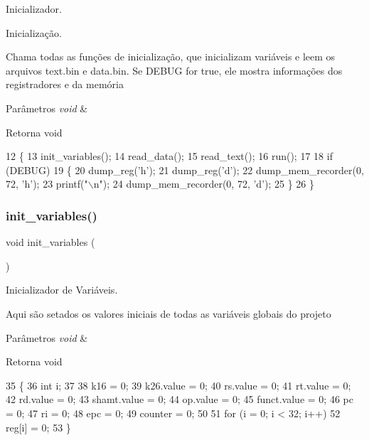 Inicializador. 

Inicialização.

Chama todas as funções de inicialização, que inicializam variáveis e leem os arquivos text.\+bin e data.\+bin. Se D\+E\+B\+UG for true, ele mostra informações dos registradores e da memória 
\begin{DoxyParams}{Parâmetros}
{\em void} & \\
\hline
\end{DoxyParams}
\begin{DoxyReturn}{Retorna}
void 
\end{DoxyReturn}

\begin{DoxyCode}
12 \{
13     init_variables();
14     read_data();
15     read_text();
16     run();
17 
18     \textcolor{keywordflow}{if} (DEBUG)
19     \{
20         dump_reg(\textcolor{charliteral}{'h'});
21         dump_reg(\textcolor{charliteral}{'d'});
22         dump_mem_recorder(0, 72, \textcolor{charliteral}{'h'});
23         printf(\textcolor{stringliteral}{"\(\backslash\)n"});
24         dump_mem_recorder(0, 72, \textcolor{charliteral}{'d'});
25     \}
26 \}
\end{DoxyCode}
\mbox{\label{init_8c_a2977fbd2f72d5a8a5da608f804bd2a6f}} 
\subsubsection{init\+\_\+variables()}
{\footnotesize\ttfamily void init\+\_\+variables (\begin{DoxyParamCaption}\item[{void}]{ }\end{DoxyParamCaption})}



Inicializador de Variáveis. 

Aqui são setados os valores iniciais de todas as variáveis globais do projeto 
\begin{DoxyParams}{Parâmetros}
{\em void} & \\
\hline
\end{DoxyParams}
\begin{DoxyReturn}{Retorna}
void 
\end{DoxyReturn}

\begin{DoxyCode}
35 \{
36     \textcolor{keywordtype}{int} i;
37 
38     k16 = 0;
39     k26.value = 0;
40     rs.value = 0;
41     rt.value = 0;
42     rd.value = 0;
43     shamt.value = 0;
44     op.value = 0;
45     funct.value = 0;
46     pc = 0;
47     ri = 0;
48     epc = 0;
49     counter = 0;
50 
51     \textcolor{keywordflow}{for} (i = 0; i < 32; i++)
52         reg[i] = 0;
53 \}
\end{DoxyCode}
\mbox{\label{init_8c_abd335e5ea78a68ce84aaaed3bb02ff19}} 
